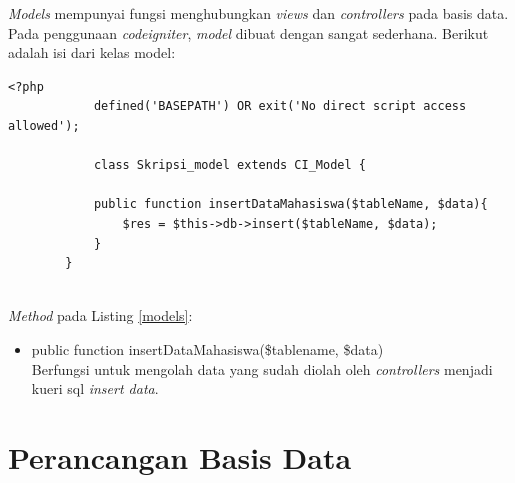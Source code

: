 	\textit{Models} mempunyai fungsi menghubungkan \textit{views} dan \textit{controllers} pada basis data. Pada penggunaan \textit{codeigniter}, \textit{model} dibuat dengan sangat sederhana. Berikut adalah isi dari kelas model:
	\begin{lstlisting}[caption= File Model, label= models]
		<?php
			defined('BASEPATH') OR exit('No direct script access allowed');
			
			class Skripsi_model extends CI_Model {
			
			public function insertDataMahasiswa($tableName, $data){
				$res = $this->db->insert($tableName, $data);
			}
		}
		
	\end{lstlisting}
	\textit{Method} pada Listing \ref{models}:
	\begin{itemize}
		\item public function insertDataMahasiswa(\$tablename, \$data)\\
		Berfungsi untuk mengolah data yang sudah diolah oleh \textit{controllers} menjadi kueri sql \textit{insert data}.
	\end{itemize}
	
	\section{Perancangan Basis Data}
	\label{sec: perancanganDatabase}
	
